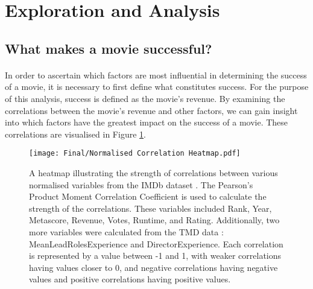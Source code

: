 \section{Exploration and Analysis}
    \subsection{What makes a movie successful?}
        \paragraph{}
            In order to ascertain which factors are most influential in determining the
                success of a movie, it is necessary to first define what constitutes success.
            For the purpose of this analysis, success is defined as the movie's revenue.
            By examining the correlations between the movie's revenue and other factors, we
                can gain insight into which factors have the greatest impact on the success of
                a movie.
            These correlations are visualised in Figure \ref*{fig-heatmap}.

            \begin{figure}[H]
                \centering
                \texttt{[image: Final/Normalised Correlation Heatmap.pdf]}
                \caption[short]{
                    A heatmap illustrating the strength of correlations between various normalised
                    variables from the IMDb dataset \cite{data:IMDb}.
                    The Pearson's Product Moment Correlation Coefficient is used to calculate the
                        strength of the correlations.
                    These variables included Rank, Year, Metascore, Revenue, Votes, Runtime, and
                        Rating.
                    Additionally, two more variables were calculated from the TMD data
                        \cite{data:TMD}: MeanLeadRolesExperience and DirectorExperience.
                    Each correlation is represented by a value between -1 and 1, with weaker
                        correlations having values closer to 0, and negative correlations having
                        negative values and positive correlations having positive values.
                }\label{fig-heatmap}
            \end{figure}

